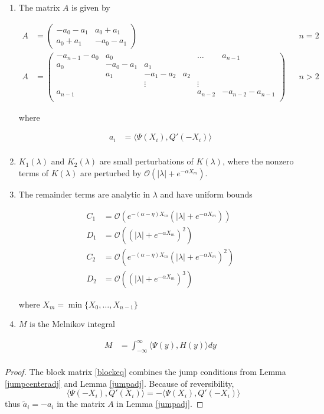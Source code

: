 \documentclass[thesis.tex]{subfiles}
\begin{document}
\begin{theorem}
\begin{enumerate}
\item The matrix $A$ is given by

\begin{align*}
A &= \begin{pmatrix}
-a_0 -a_1 & a_0 + a_1 \\
a_0 + a_1 & -a_0 - a_1
\end{pmatrix} && n = 2 \\
A &= \begin{pmatrix}
-a_{n-1} - a_0 & a_0 & & & \dots & a_{n-1}\\
a_0 & -a_0 - a_1 &  a_1 \\
& a_1 & -a_1 - a_2 &  a_2 \\
& & \vdots & & \vdots \\
a_{n-1} & & & & a_{n-2} & -a_{n-2} - a_{n-1} \\
\end{pmatrix} && n > 2
\end{align*}

where

\begin{align*}
a_i &= \langle \Psi(X_i), Q'(-X_i) \rangle \\
\end{align*}

\item $K_1(\lambda)$ and $K_2(\lambda)$ are small perturbations of $K(\lambda)$, where the nonzero terms of $K(\lambda)$ are perturbed by $\mathcal{O}(|\lambda| + e^{-\alpha X_m})$.

\item The remainder terms are analytic in $\lambda$ and have uniform bounds

\begin{align*}
C_1 &= \mathcal{O}\left(e^{-(\alpha - \eta) X_m}(|\lambda| + e^{-\alpha X_m}) \right) \\
D_1 &= \mathcal{O}\left((|\lambda| + e^{-\alpha X_m})^2 \right) \\
C_2 &= \mathcal{O}\left(e^{-(\alpha - \eta) X_m}(|\lambda| + e^{-\alpha X_m})^2 \right) \\
D_2 &= \mathcal{O}\left((|\lambda| + e^{-\alpha X_m})^3 \right)
\end{align*}

where $X_m = \min \{X_0, \dots, X_{n-1}\}$

\item $M$ is the Melnikov integral

\begin{align*}
M &= \int_{-\infty}^\infty \langle \Psi(y), H(y) \rangle dy \\
\end{align*}

\end{enumerate}

\begin{proof}
The block matrix \eqref{blockeq} combines the jump conditions from Lemma \ref{jumpcenteradj} and Lemma \ref{jumpadj}. Because of reversibility, 
\[
\langle \Psi(-X_i), Q'(X_i) \rangle = -\langle \Psi(X_i), Q'(-X_i) \rangle
\]
thus $\tilde{a}_i = -a_i$ in the matrix $A$ in Lemma \ref{jumpadj}.
\end{proof}
\end{theorem}
\end{document}
